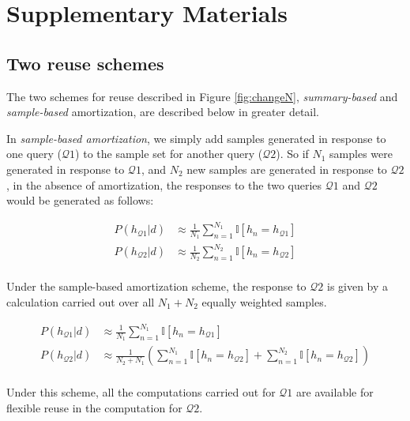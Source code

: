 \chapter{Supplementary Materials}
\label{app}

\section{Two reuse schemes}
\label{app:2schemes}

The two schemes for reuse described in Figure \ref{fig:changeN}, \emph{summary-based} and \emph{sample-based} amortization, are described below in greater detail. 


In \emph{sample-based amortization}, we simply add samples generated in response to one query ($\mathcal{Q}1$) to the sample set for another query ($\mathcal{Q}2$). So if $N_1$ samples were generated in response to $\mathcal{Q}1$, and $N_2$ new samples are generated in response to $\mathcal{Q}2$, in the absence of amortization, the responses to the two queries $\mathcal{Q}1$ and $\mathcal{Q}2$ would be generated as follows:

\begin{align*}
\textstyle
P(h_{\mathcal{Q}1}|d) & \approx \frac{1}{N_1}\sum_{n=1}^{N_1} \mathbb{I}[h_n=h_{\mathcal{Q}1}]\\
P(h_{\mathcal{Q}2}|d) & \approx \frac{1}{N_2}\sum_{n=1}^{N_2} \mathbb{I}[h_n=h_{\mathcal{Q}2}]\\
\end{align*}

Under the sample-based amortization scheme, the response to $\mathcal{Q}2$ is given by a calculation carried out over all $N_1 + N_2$ equally weighted samples.

\begin{align*}
\textstyle
P(h_{\mathcal{Q}1}|d) & \approx \frac{1}{N_1}\sum_{n=1}^{N_1} \mathbb{I}[h_n=h_{\mathcal{Q}1}]\\
P(h_{\mathcal{Q}2}|d) & \approx \frac{1}{N_2 + N_1}  \left( \sum_{n=1}^{N_1} \mathbb{I}[h_n=h_{\mathcal{Q}2}] + \sum_{n=1}^{N_2} \mathbb{I}[h_n=h_{\mathcal{Q}2}] \right)\\
\end{align*}

Under this scheme, all the computations carried out for $\mathcal{Q}1$ are available for flexible reuse in the computation for $\mathcal{Q}2$. 


